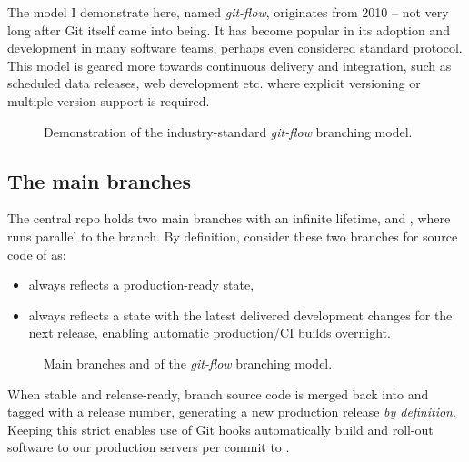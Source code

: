 The model I demonstrate here, named \emph{git-flow}, originates from 2010 -- not very long after Git itself came into being. It has become popular in its adoption and development in many software teams, perhaps even considered standard protocol. This model is geared more towards continuous delivery and integration, such as scheduled data releases, web development etc. where explicit versioning or multiple version support is required.

\vspace{11\baselineskip}%
\begin{figure}[H]
	\centering
	\noindent\resizebox{\textwidth}{!}{}
	\caption[A successful Git branching model]{Demonstration of the industry-standard \emph{git-flow} branching model.}
\end{figure}



\subsection{The main branches}

The central repo holds two main branches with an infinite lifetime,  and , where  runs parallel to the  branch. By definition, consider these two branches for source code of  as:

\begin{itemize}
	\item {} always reflects a production-ready state,
	\item {} always reflects a state with the latest delivered development changes for the next release, enabling automatic production/CI builds overnight.
\end{itemize}

\vspace{6\baselineskip}%
\begin{figure}[H]
	\centering
	\noindent\resizebox{.66\textwidth}{!}{}
	\caption[Main branches]{Main branches  and  of the \emph{git-flow} branching model.}
\end{figure}

When stable and release-ready,  branch source code is merged back into  and tagged with a release number, generating a new production release \emph{by definition}. Keeping this strict enables use of Git hooks automatically build and roll-out software to our production servers per commit to .



